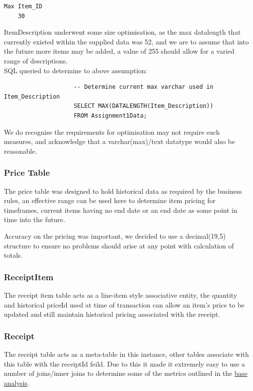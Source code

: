 \documentclass{article}
\begin{document}
                \begin{Verbatim}[fontsize=\small]
    Max Item_ID
    30
                \end{Verbatim}
                ItemDescription underwent some size optimisation, as the max datalength 
                that currently existed within the supplied data was 52, and we are to assume
                that into the future more items may be added, a value of 255 should allow
                for a varied range of descriptions.
                \\
                SQL queried to determine to above assumption:

                \begin{lstlisting}
                    -- Determine current max varchar used in Item_Description
                    SELECT MAX(DATALENGTH(Item_Description)) 
                    FROM Assignment1Data;
                \end{lstlisting}

                We do recognise the requirements for optimisation may not require such measures, and 
                acknowledge that a varchar(max)/text datatype would also be reasonable.
            \subsubsection{Price Table}
                The price table was designed to hold historical data as required by the business rules,
                an effective range can be used here to determine item pricing for timeframes,
                current items having no end date or an end date as some point in time into the future.
                \par
                Accuracy on the pricing was important, we decided to use a decimal(19,5) structure to
                ensure no problems should arise at any point with calculation of totals.
            \subsubsection{ReceiptItem}
                The receipt item table acts as a line-item style associative entity, the quantity and 
                historical priceId used at time of transaction can allow an item's price to be
                updated and still maintain historical pricing associated with the receipt.
            \subsubsection{Receipt}
                The receipt table acts as a meta-table in this instance, other tables associate with 
                this table with the receiptId feild. Due to this it made it extremely easy to use a number
                of joins/inner joins to determine some of the metrics outlined in the \hyperref[sec:BA]{base analysis}.
\end{document}

